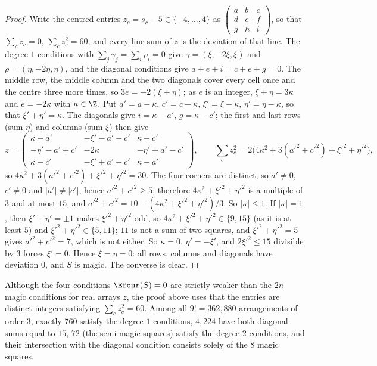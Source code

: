 \begin{proof}
Write the centred entries $z_c=s_c-5\in\{-4,\dots,4\}$ as $\left(\begin{smallmatrix}a&b&c\\d&e&f\\g&h&i\end{smallmatrix}\right)$, so that $\sum_cz_c=0$, $\sum_cz_c^2=60$, and every line sum of $z$ is the deviation of that line.
The degree-$1$ conditions with $\sum_j\gamma_j=\sum_i\rho_i=0$ give $\gamma=(\xi,-2\xi,\xi)$ and $\rho=(\eta,-2\eta,\eta)$, and the diagonal conditions give $a+e+i=c+e+g=0$.
The middle row, the middle column and the two diagonals cover every cell once and the centre three more times, so $3e=-2(\xi+\eta)$; as $e$ is an integer, $\xi+\eta=3\kappa$ and $e=-2\kappa$ with $\kappa\in\Z$.
Put $a'=a-\kappa$, $c'=c-\kappa$, $\xi'=\xi-\kappa$, $\eta'=\eta-\kappa$, so that $\xi'+\eta'=\kappa$.
The diagonals give $i=\kappa-a'$, $g=\kappa-c'$; the first and last rows (sum $\eta$) and columns (sum $\xi$) then give
\[
z=\begin{pmatrix}\kappa+a'&-\xi'-a'-c'&\kappa+c'\\-\eta'-a'+c'&-2\kappa&-\eta'+a'-c'\\\kappa-c'&-\xi'+a'+c'&\kappa-a'\end{pmatrix},
\qquad
\sum_cz_c^2=2\bigl(4\kappa^2+3(a'^2+c'^2)+\xi'^2+\eta'^2\bigr),
\]
so $4\kappa^2+3(a'^2+c'^2)+\xi'^2+\eta'^2=30$.
The four corners are distinct, so $a'\ne0$, $c'\ne0$ and $|a'|\ne|c'|$, hence $a'^2+c'^2\ge5$; therefore $4\kappa^2+\xi'^2+\eta'^2$ is a multiple of $3$ and at most $15$, and $a'^2+c'^2=10-(4\kappa^2+\xi'^2+\eta'^2)/3$.
So $|\kappa|\le1$.
If $|\kappa|=1$, then $\xi'+\eta'=\pm1$ makes $\xi'^2+\eta'^2$ odd, so $4\kappa^2+\xi'^2+\eta'^2\in\{9,15\}$ (as it is at least $5$) and $\xi'^2+\eta'^2\in\{5,11\}$; $11$ is not a sum of two squares, and $\xi'^2+\eta'^2=5$ gives $a'^2+c'^2=7$, which is not either.
So $\kappa=0$, $\eta'=-\xi'$, and $2\xi'^2\le15$ divisible by $3$ forces $\xi'=0$.
Hence $\xi=\eta=0$: all rows, columns and diagonals have deviation $0$, and $S$ is magic.
The converse is clear.
\end{proof}

\begin{remark}
\label{rem:n3_enum}
Although the four conditions $\Efour(S)=0$ are strictly weaker than the $2n$ magic conditions for real arrays $z$, the proof above uses that the entries are distinct integers satisfying $\sum_cz_c^2=60$. Among all $9!=362{,}880$ arrangements of order $3$, exactly $760$ satisfy the degree-$1$ conditions, $4{,}224$ have both diagonal sums equal to $15$, $72$ (the semi-magic squares) satisfy the degree-$2$ conditions, and their intersection with the diagonal condition consists solely of the $8$ magic squares.
\end{remark}

